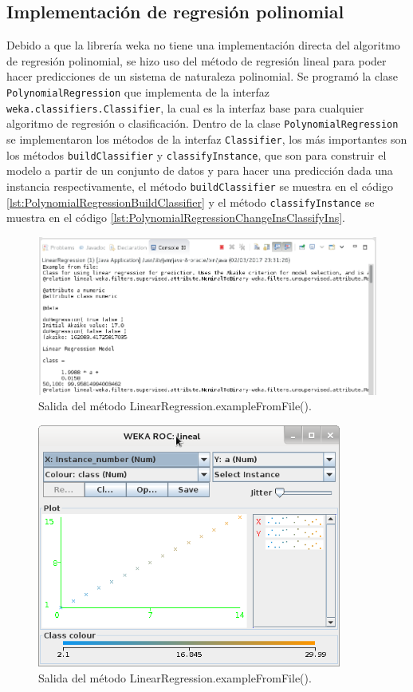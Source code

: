 \subsection{Implementación de regresión polinomial} \label{subsec:implementacionRegresionPolinomial}
Debido a que la librería weka no tiene una implementación directa del algoritmo de regresión polinomial, se hizo uso del método de regresión lineal para poder hacer predicciones de un sistema de naturaleza polinomial. 
Se programó la clase \texttt{PolynomialRegression} que implementa de la interfaz \texttt{weka.classifiers.Classifier}, la cual es la interfaz base para cualquier algoritmo de regresión o clasificación.
Dentro de la clase \texttt{PolynomialRegression} se implementaron los métodos de la interfaz \texttt{Classifier}, los más importantes son los métodos \texttt{buildClassifier} y \texttt{classifyInstance}, que son para construir el modelo a partir de un conjunto de datos y para hacer una predicción dada una instancia respectivamente, 
el método \texttt{buildClassifier} se muestra en el código \ref{lst:PolynomialRegressionBuildClassifier} 
y el método \texttt{classifyInstance} se muestra en el código \ref{lst:PolynomialRegressionChangeInsClassifyIns}.

\begin{figure}[h]
	\centering
	\includegraphics[width=16cm]{img/salidaMetodoLinearRegression.png}
	\caption{Salida del método LinearRegression.exampleFromFile().}
	\label{fig:salidaMetodoLinearRegression}
\end{figure}
\clearpage
\begin{figure}[h]
	\centering
	\includegraphics[width=10cm]{img/representacionGraficaDatosLinearR.png}
	\caption{Salida del método LinearRegression.exampleFromFile().}
	\label{fig:representacionGraficaDatosLinearR}
\end{figure}


